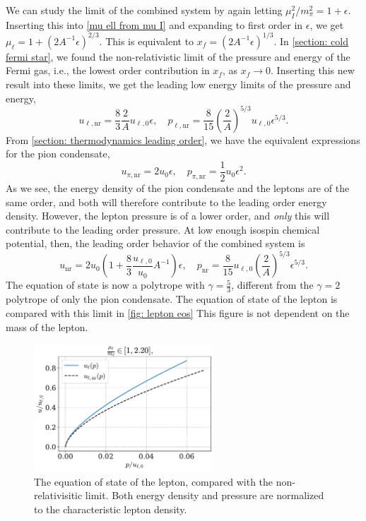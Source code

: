 We can study the limit of the combined system by again letting $\mu_I^2/m_\pi^2 = 1 + \epsilon$.
Inserting this into \autoref{mu ell from mu I} and expanding to first order in $\epsilon$, we get $\mu_\ell = 1 + (2 A^{-1} \epsilon)^{2/3} $.
This is equivalent to $x_f = (2 A^{-1} \epsilon)^{1/3} $.
In \autoref{section: cold fermi star}, we found the non-relativistic limit of the pressure and energy of the Fermi gas, i.e., the lowest order contribution in $x_f$, as $x_f \rightarrow 0$.
Inserting this new result into these limits, we get the leading low energy limits of the pressure and energy, 
%
\begin{equation}
    u_{\ell, \text{nr}} = \frac{8}{3} \frac{2}{A} u_{\ell,0} \epsilon, \quad
    p_{\ell, \text{nr}} = \frac{8}{15} \left(\frac{2}{A} \right)^{5/3}  u_{\ell,0}  \epsilon^{5/3}.
\end{equation}
%
From \autoref{section: thermodynamics leading order}, we have the equivalent expressions for the pion condensate,
%
\begin{equation}
    u_{\pi, \text{nr}} = 2 u_0 \epsilon, \quad p_{\pi, \text{nr}} = \frac{1}{2} u_0 \epsilon^2.
\end{equation}
%
As we see, the energy density of the pion condensate and the leptons are of the same order, and both will therefore contribute to the leading order energy density.
However, the lepton pressure is of a lower order, and \emph{only} this will contribute to the leading order pressure.
At low enough isospin chemical potential, then, the leading order behavior of the combined system is
%
\begin{equation}
    u_{\text{nr}} = 2 u_0 \left(1 + \frac{8}{3} \frac{u_{\ell,0}}{u_0} A^{-1} \right)\epsilon ,\quad
    p_{\text{nr}} = \frac{8}{15} u_{\ell,0} \left(\frac{2}{A} \right)^{5/3} \epsilon^{5/3}.
\end{equation}
%
The equation of state is now a polytrope with $\gamma = \frac{5}{3}$, different from the $\gamma = 2$ polytrope of only the pion condensate.
The equation of state of the lepton is compared with this limit in \autoref{fig: lepton eos}
This figure is not dependent on the mass of the lepton.

\begin{figure}
    \centering
    \includegraphics[width=0.6\textwidth]{../scripts/figurer/charge_neutrality/eos_lepton.pdf}
    \caption{The equation of state of the lepton, compared with the non-relativisitic limit.
    Both energy density and pressure are normalized to the characteristic lepton density.}
    \label{fig: lepton eos}
\end{figure}


